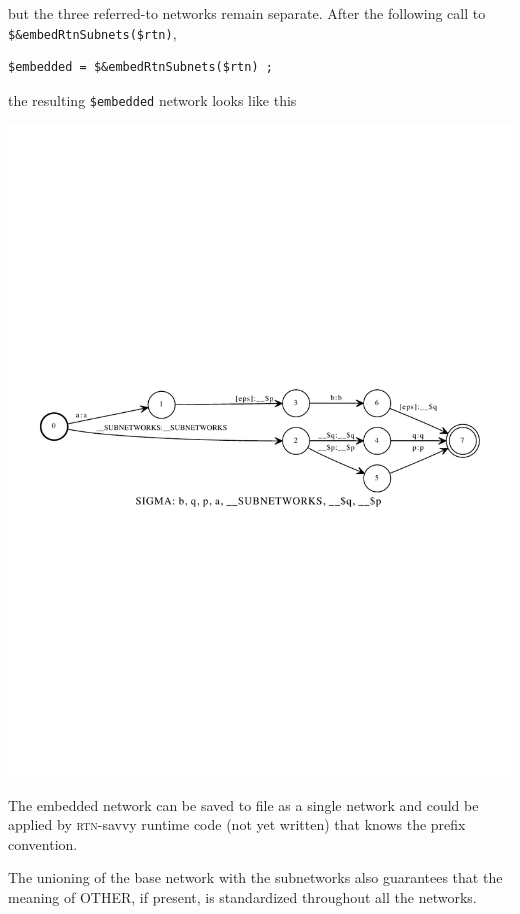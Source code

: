 \documentclass[letterpaper,12pt]{article}
\newcommand{\acro}{\textsc}
\begin{document}
\noindent
but the three referred-to networks remain separate.  After the following
call to \verb!$&embedRtnSubnets($rtn)!, 

\begin{Verbatim}[fontsize=\small]
$embedded = $&embedRtnSubnets($rtn) ;
\end{Verbatim}


\noindent
the resulting \verb!$embedded! network looks like this

\begin{center}
\includegraphics[width=\textwidth]{images/embedded.pdf}
\end{center}

\noindent
The embedded network can be saved to file as a single network and could be
applied by \acro{rtn}-savvy runtime code (not yet written) that knows the prefix convention.

The unioning of the base network with the subnetworks also guarantees that
the meaning of OTHER, if present, is standardized throughout all the
networks.
\end{document}
